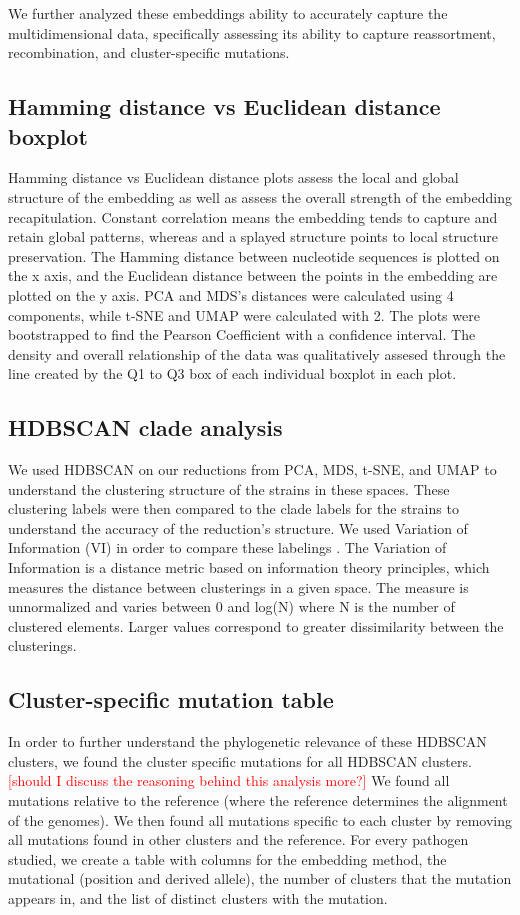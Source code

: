 \documentclass[10pt,letterpaper]{article}
\def\jhc#1{\textcolor{red}{[#1]}}
\begin{document}
We further analyzed these embeddings ability to accurately capture the multidimensional data, specifically assessing its ability to capture reassortment, recombination, and cluster-specific mutations.

\subsection*{Hamming distance vs Euclidean distance boxplot}

Hamming distance vs Euclidean distance plots assess the local and global structure of the embedding as well as assess the overall strength of the embedding recapitulation.
Constant correlation means the embedding tends to capture and retain global patterns, whereas and a splayed structure points to local structure preservation.
The Hamming distance between nucleotide sequences is plotted on the x axis, and the Euclidean distance between the points in the embedding are plotted on the y axis.
PCA and MDS's distances were calculated using 4 components, while t-SNE and UMAP were calculated with 2.
The plots were bootstrapped to find the Pearson Coefficient with a confidence interval.
The density and overall relationship of the data was qualitatively assesed through the line created by the Q1 to Q3 box of each individual boxplot in each plot.

\subsection*{HDBSCAN clade analysis}
We used HDBSCAN \cite{campello2015hierarchical} on our reductions from PCA, MDS, t-SNE, and UMAP to understand the clustering structure of the strains in these spaces.
These clustering labels were then compared to the clade labels for the strains to understand the accuracy of the reduction's structure.
We used Variation of Information (VI) in order to compare these labelings \cite{meilua2003comparing}.
The Variation of Information is a distance metric based on information theory principles, which measures the distance between clusterings in a given space.
The measure is unnormalized and varies between 0 and log(N) where N is the number of clustered elements.
Larger values correspond to greater dissimilarity between the clusterings.

\subsection*{Cluster-specific mutation table}
In order to further understand the phylogenetic relevance of these HDBSCAN clusters, we found the cluster specific mutations for all HDBSCAN clusters.
\jhc{should I discuss the reasoning behind this analysis more?}
We found all mutations relative to the reference (where the reference determines the alignment of the genomes).
We then found all mutations specific to each cluster by removing all mutations found in other clusters and the reference.
For every pathogen studied, we create a table with columns for the embedding method, the mutational (position and derived allele), the number of clusters that the mutation appears in, and the list of distinct clusters with the mutation.
\end{document}
